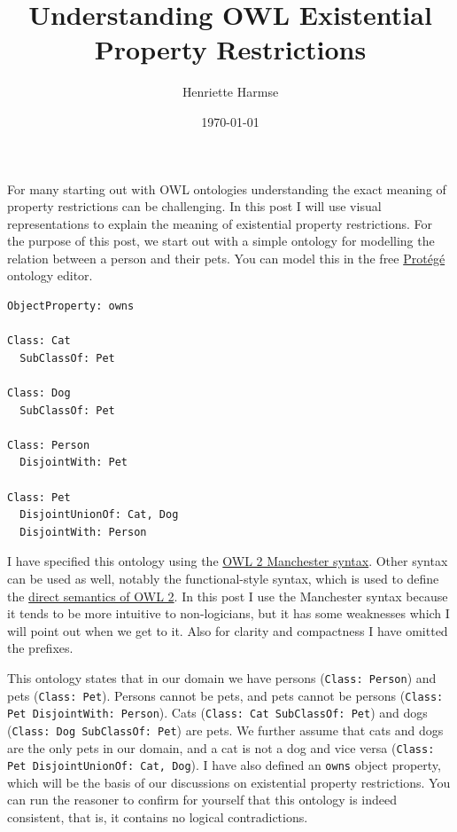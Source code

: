 \documentclass{amsart}
\title{Understanding OWL Existential Property Restrictions}
\author{Henriette Harmse}
\date{\today}
\begin{document}
  \maketitle
  
  For many starting out with OWL ontologies understanding the exact meaning of property restrictions can be challenging. In this post I will use visual representations to explain the meaning of existential property restrictions. For the purpose of this post, we start out with a simple ontology for modelling the relation between a person and their pets.  You can model this in the free \href{https://protege.stanford.edu/products.php}{Prot\'{e}g\'{e}} ontology editor.
  
\begin{small}
\begin{verbatim} 
ObjectProperty: owns
        
Class: Cat
  SubClassOf: Pet
    
Class: Dog
  SubClassOf: Pet
    
Class: Person
  DisjointWith: Pet
        
Class: Pet
  DisjointUnionOf: Cat, Dog
  DisjointWith: Person    
\end{verbatim}
\end{small}  

I have specified this ontology using the \href{http://www.w3.org/TR/owl2-manchester-syntax/}{OWL 2 Manchester syntax}. Other syntax can be used as well, notably the functional-style syntax, which is used to define the \href{https://www.w3.org/TR/owl2-direct-semantics/}{direct semantics of OWL 2}. In this post I use the Manchester syntax because it tends to be more intuitive to non-logicians, but it has some weaknesses which I will point out when we get to it. Also for clarity and compactness I have omitted the prefixes.

This ontology states that in our domain we have persons (\texttt{Class: Person}) and pets (\texttt{Class: Pet}). Persons cannot be pets, and pets cannot be persons (\texttt{Class: Pet DisjointWith: Person}). Cats (\texttt{Class: Cat SubClassOf: Pet}) and dogs (\texttt{Class: Dog SubClassOf: Pet}) are pets. We further assume that cats and dogs are the only pets in our domain, and a cat is not a dog and vice versa (\texttt{Class: Pet  DisjointUnionOf: Cat, Dog}). I have also defined an \texttt{owns} object property, which will be the basis of our discussions on existential property restrictions. You can run the reasoner to confirm for yourself that this ontology is indeed consistent, that is, it contains no logical contradictions.
  
\end{document}
